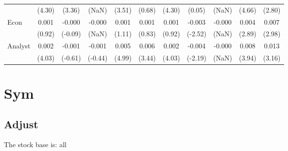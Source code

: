 \documentclass[
]{article}
\begin{document}
\begin{table}[H]
{\begin{tabular}{lcccccccccc}
   & (4.30) & (3.36) & (NaN) & (3.51) & (0.68) & (4.30) & (0.05) & (NaN) & (4.66) & (2.80) \\ 
  Econ & 0.001 & -0.000 & -0.000 & 0.001 & 0.001 & 0.001 & -0.003 & -0.000 & 0.004 & 0.007 \\ 
   & (0.92) & (-0.09) & (NaN) & (1.11) & (0.83) & (0.92) & (-2.52) & (NaN) & (2.89) & (2.98) \\ 
  Analyst & 0.002 & -0.001 & -0.001 & 0.005 & 0.006 & 0.002 & -0.004 & -0.000 & 0.008 & 0.013 \\ 
   & (4.03) & (-0.61) & (-0.44) & (4.99) & (3.44) & (4.03) & (-2.19) & (NaN) & (3.94) & (3.16) \\ 
   \hline 
\end{tabular}
}
\end{table}

\newpage
\section{Sym}

\subsection{Adjust}

The stock base is: all
\end{document}
